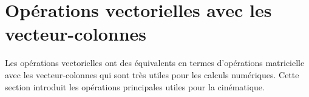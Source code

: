




\section{Opérations vectorielles avec les vecteur-colonnes} 
\label{sec:opeveccol}
%
Les opérations vectorielles ont des équivalents en termes d'opérations matricielle avec les vecteur-colonnes qui sont très utiles pour les calculs numériques. Cette section introduit les opérations principales utiles pour la cinématique.

